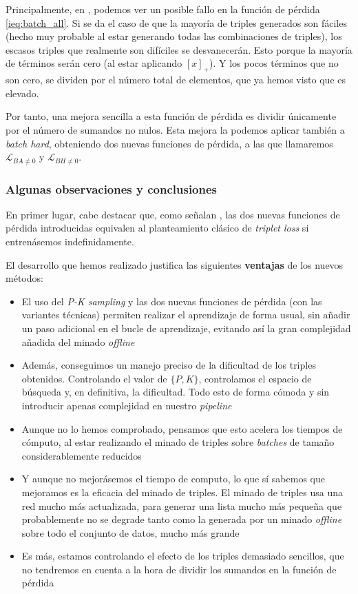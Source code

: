 Principalmente, en , podemos ver un posible fallo en la función de pérdida \eqref{ieq:batch_all}. Si se da el caso de que la mayoría de triples generados son fáciles (hecho muy probable al estar generando todas las combinaciones de triples), los escasos triples que realmente son difíciles se desvanecerán. Esto porque la mayoría de términos serán cero (al estar aplicando $[x]_+$). Y los pocos términos que no son cero, se dividen por el número total de elementos, que ya hemos visto que es elevado.

Por tanto, una mejora sencilla a esta función de pérdida es dividir únicamente por el número de sumandos no nulos. Esta mejora la podemos aplicar también a \textit{batch hard}, obteniendo dos nuevas funciones de pérdida, a las que llamaremos $\mathcal{L}_{BA \neq 0}$ y $\mathcal{L}_{BH \neq 0}$.

\subsubsection{Algunas observaciones y conclusiones} \label{isubsubs:observaciones_conclusiones_pksampling}

En primer lugar, cabe destacar que, como señalan \cite{informatica:principal}, las dos nuevas funciones de pérdida introducidas equivalen al planteamiento clásico de \textit{triplet loss} si entrenásemos indefinidamente.

El desarrollo que hemos realizado justifica las siguientes \textbf{ventajas} de los nuevos métodos:

\begin{itemize}
    \item El uso del \textit{P-K sampling} y las dos nuevas funciones de pérdida (con las variantes técnicas) permiten realizar el aprendizaje de forma usual, sin añadir un paso adicional en el bucle de aprendizaje, evitando así la gran complejidad añadida del minado \textit{offline}
    \item Además, conseguimos un manejo preciso de la dificultad de los triples obtenidos. Controlando el valor de $\{P, K\}$, controlamos el espacio de búsqueda y, en definitiva, la dificultad. Todo esto de forma cómoda y sin introducir apenas complejidad en nuestro \textit{pipeline}
    \item Aunque no lo hemos comprobado, pensamos que esto acelera los tiempos de cómputo, al estar realizando el minado de triples sobre \textit{batches} de tamaño considerablemente reducidos
    \item Y aunque no mejorásemos el tiempo de computo, lo que sí sabemos que mejoramos es la eficacia del minado de triples. El minado de triples usa una red mucho más actualizada, para generar una lista mucho más pequeña que probablemente no se degrade tanto como la generada por un minado \textit{offline} sobre todo el conjunto de datos, mucho más grande
    \item Es más, estamos controlando el efecto de los triples demasiado sencillos, que no tendremos en cuenta a la hora de dividir los sumandos en la función de pérdida
\end{itemize}


